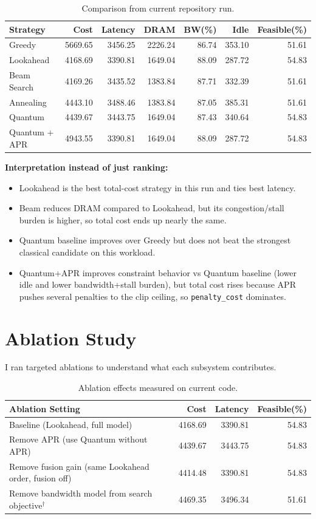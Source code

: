 \documentclass[11pt]{article}
\begin{document}
\begin{table}[h]
\centering
\begin{tabular}{lrrrrrr}
\toprule
Strategy & Cost & Latency & DRAM & BW(\%) & Idle & Feasible(\%) \\
\midrule
Greedy & 5669.65 & 3456.25 & 2226.24 & 86.74 & 353.10 & 51.61 \\
Lookahead & 4168.69 & 3390.81 & 1649.04 & 88.09 & 287.72 & 54.83 \\
Beam Search & 4169.26 & 3435.52 & 1383.84 & 87.71 & 332.39 & 51.61 \\
Annealing & 4443.10 & 3488.46 & 1383.84 & 87.05 & 385.31 & 51.61 \\
Quantum & 4439.67 & 3443.75 & 1649.04 & 87.43 & 340.64 & 54.83 \\
Quantum + APR & 4943.55 & 3390.81 & 1649.04 & 88.09 & 287.72 & 54.83 \\
\bottomrule
\end{tabular}
\caption{Comparison from current repository run.}
\end{table}

\textbf{Interpretation instead of just ranking:}
\begin{itemize}
    \item Lookahead is the best total-cost strategy in this run and ties best latency.
    \item Beam reduces DRAM compared to Lookahead, but its congestion/stall burden is higher, so total cost ends up nearly the same.
    \item Quantum baseline improves over Greedy but does not beat the strongest classical candidate on this workload.
    \item Quantum+APR improves constraint behavior vs Quantum baseline (lower idle and lower bandwidth+stall burden), but total cost rises because APR pushes several penalties to the clip ceiling, so \texttt{penalty\_cost} dominates.
\end{itemize}

\section{Ablation Study}
I ran targeted ablations to understand what each subsystem contributes.

\begin{table}[h]
\centering
\begin{tabular}{lrrr}
\toprule
Ablation Setting & Cost & Latency & Feasible(\%) \\
\midrule
Baseline (Lookahead, full model) & 4168.69 & 3390.81 & 54.83 \\
Remove APR (use Quantum without APR) & 4439.67 & 3443.75 & 54.83 \\
Remove fusion gain (same Lookahead order, fusion off) & 4414.48 & 3390.81 & 54.83 \\
Remove bandwidth model from search objective$^\dagger$ & 4469.35 & 3496.34 & 51.61 \\
\bottomrule
\end{tabular}
\caption{Ablation effects measured on current code.}
\end{table}
\end{document}
